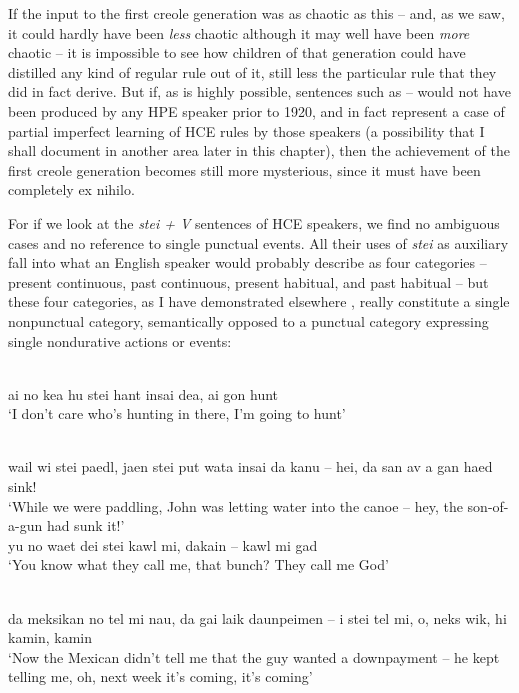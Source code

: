If the input to the first creole generation was as chaotic as this -- and, as we saw, it could hardly have been \textit{less} chaotic although it may well have been \textit{more} chaotic -- it is impossible to see how children of that generation could have distilled any kind of regular rule out of it, still less the particular rule that they did in fact derive. But if, as is highly possible, sentences such as -- would not have been produced by any HPE speaker prior to 1920, and in fact represent a case of partial imperfect learning of HCE rules by those speakers (a possibility that I shall document in another area later in this chapter), then the achievement of the first creole generation becomes still more mysterious, since it must have been completely ex nihilo.

For if we look at the \textit{stei + V} sentences of HCE speakers, we find no ambiguous cases and no reference to single punctual events. All their uses of \textit{stei} as auxiliary fall into what an English speaker would probably describe as four categories -- present continuous, past con\-tinuous, present habitual, and past habitual -- but these four categories, as I have demonstrated elsewhere \citep[Chapter 2]{Bickerton1975}, really constitute a single nonpunctual category, semantically opposed to a punctual category expressing single nondurative actions or events:

\ea\label{ex:52}
\\
ai no kea hu stei hant insai dea, ai gon hunt \\
\glt `I don't care who's hunting in there, I'm going to hunt'
\z

\ea\label{ex:53}
\\
wail wi stei paedl, jaen stei put wata insai da kanu -- hei, da san av a gan haed sink!\\
\glt `While we were paddling, John was letting water into the canoe -- hey, the son-of-a-gun had sunk it!'
\z
\ea\label{ex:54}
 \\
 yu no waet dei stei kawl mi, dakain -- kawl mi gad\\
\glt `You know what they call me, that bunch? They call me God'
\z

\ea\label{ex:55}
\\
da meksikan no tel mi nau, da gai laik daunpeimen -- i stei tel mi, o, neks wik, hi kamin, kamin\\
\glt `Now the Mexican didn't tell me that the guy wanted a down\-payment -- he kept telling me, oh, next week it's coming, it's coming'
\z

